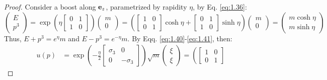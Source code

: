\begin{proposition}{}{}
  \begin{proof}
    Consider a boost along $ \mathbf{e}_z $, parametrized by rapidity $ \eta $, by Eq. \ref{eq:1.36}:
    \begin{equation*}
      \begin{pmatrix}
        E \\ p^3
      \end{pmatrix}
      = \exp \left( \eta
        \begin{bmatrix}
          0 & 1 \\ 1 & 0
        \end{bmatrix}
      \right)
      \begin{pmatrix}
        m \\ 0
      \end{pmatrix}
      = \left(
        \begin{bmatrix}
          1 & 0 \\ 0 & 1
        \end{bmatrix}
      \cosh \eta +
        \begin{bmatrix}
          0 & 1 \\ 1 & 0
        \end{bmatrix}
      \sinh \eta \right)
      \begin{pmatrix}
        m \\ 0
      \end{pmatrix}
      =
      \begin{pmatrix}
        m \cosh \eta \\ m \sinh \eta
      \end{pmatrix}
    \end{equation*}
    Thus, $ E + p^3 = e^\eta m $ and $ E - p^3 = e^{-\eta} m $. By Eqq. \ref{eq:1.40}-\ref{eq:1.41}, then:
    \begin{equation*}
      \begin{split}
        u(p) &= \exp \left( - \frac{\eta}{2}
          \begin{bmatrix}
            \sigma_3 & 0 \\ 0 & - \sigma_3
          \end{bmatrix}
        \right) \sqrt{m}
        \begin{pmatrix}
          \xi \\ \xi
        \end{pmatrix} = \left(
                  \begin{bmatrix}
                  1 & 0 \\ 0 & 1
                  \end{bmatrix}

\end{split}
\end{equation*}
\end{proof}
\end{proposition}
